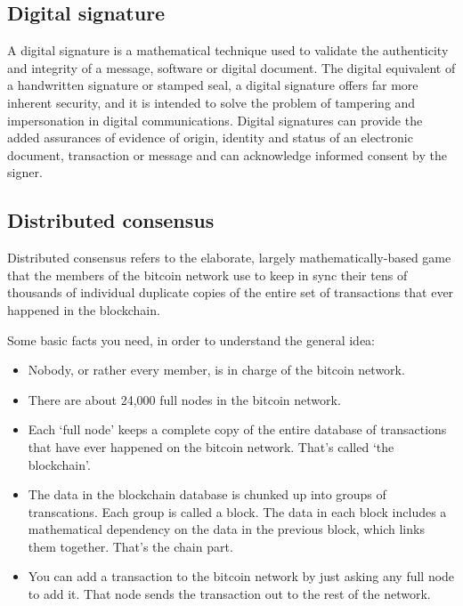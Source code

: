 \documentclass{article}
\begin{document}
\subsection{Digital signature}
A digital signature is a mathematical technique used to validate the
authenticity and integrity of a message, software or digital document. The
digital equivalent of a handwritten signature or stamped seal, a digital
signature offers far more inherent security, and it is intended to solve the
problem of tampering and impersonation in digital communications. Digital
signatures can provide the added assurances of evidence of origin, identity
and status of an electronic document, transaction or message and can
acknowledge informed consent by the signer.

\subsection{Distributed consensus}
Distributed consensus refers to the elaborate, largely mathematically-based
game that the members of the bitcoin network use to keep in sync their tens of
thousands of individual duplicate copies of the entire set of transactions
that ever happened in the blockchain.

Some basic facts you need, in order to understand the general idea:
\begin{itemize}
    \item Nobody, or rather every member, is in charge of the bitcoin network.
    \item There are about 24,000 full nodes in the bitcoin network.
    \item Each `full node' keeps a complete copy of the entire database of
        transactions that have ever happened on the bitcoin network. That's
        called `the blockchain'.
    \item The data in the blockchain database is chunked up into groups of
        transcations. Each group is called a block. The data in each block
        includes a mathematical dependency on the data in the previous block,
        which links them together. That's the chain part.
    \item You can add a transaction to the bitcoin network by just asking any
        full node to add it. That node sends the transaction out to the rest
        of the network.
\end{itemize}
\end{document}
